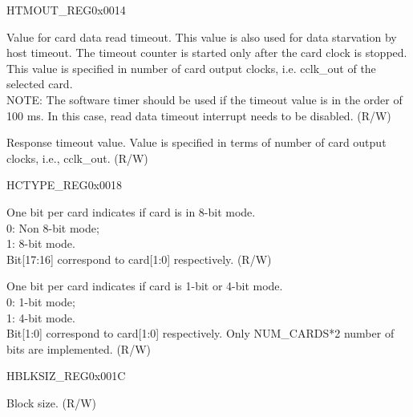 \begin{register}{H}{TMOUT\_REG}{0x0014}\label{regdesc:TMOUTREG}
%
%
\regnewline%
\begin{regdesc}\begin{reglist}
\item [DATA\_TIMEOUT]Value for card data read timeout. This value is also used for data starvation by host timeout. The timeout counter is started only after the card clock is stopped. This value is specified in number of card output clocks, i.e. cclk\_out of the selected card.\\
NOTE: The software timer should be used if the timeout value is in the order of 100 ms. In this case, read data timeout interrupt needs to be disabled. (R/W)
\item [RESPONSE\_TIMEOUT]Response timeout value. Value is specified in terms of number of card output clocks, i.e., cclk\_out. (R/W)
\end{reglist}\end{regdesc}
\end{register}


\begin{register}{H}{CTYPE\_REG}{0x0018}\label{regdesc:CTYPEREG}
%
%
%
%
\regnewline%
\begin{regdesc}\begin{reglist}
\item [CARD\_WIDTH8]One bit per card indicates if card is in 8-bit mode.\\
0: Non 8-bit mode;\\
1: 8-bit mode.\\
Bit[17:16] correspond to card[1:0] respectively. (R/W)
\item [CARD\_WIDTH4]One bit per card indicates if card is 1-bit or 4-bit mode.\\
0: 1-bit mode;\\
1: 4-bit mode.\\
Bit[1:0] correspond to card[1:0] respectively. Only NUM\_CARDS*2 number of bits are implemented. (R/W)
\end{reglist}\end{regdesc}
\end{register}


\begin{register}{H}{BLKSIZ\_REG}{0x001C}\label{regdesc:BLKSIZREG}
%
%
\regnewline%
\begin{regdesc}\begin{reglist}
\item [BLOCK\_SIZE]Block size. (R/W)
\end{reglist}\end{regdesc}
\end{register}



